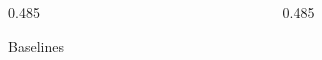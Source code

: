 \documentclass[final]{beamer}
\newcommand{\symA}{\textcolor{ecblue}{\texttt{a}}}
\newcommand{\symB}{\textcolor{ecorange}{\texttt{b}}}
\newcommand{\symC}{\textcolor{ecpurple}{\texttt{c}}}
\newcommand{\ob}[1]{\textcolor{evallmHighlight}{\textbf{#1}}} %
\newcommand{\pulled}[1]{\highLight[ecgreen!28]{\textbf{#1}}}
\newcommand{\qt}[1]{\highLight[evallmHighlight!30]{#1}}
\newcommand{\mask}{\textbf{\textcolor{ecgreen}{?}}}
\begin{document}
\begin{frame}[t]
\begin{columns}[t, totalwidth=\textwidth]
\begin{column}{0.485\textwidth}
\begin{minipage}[t][\colht][t]{\linewidth}
\begin{block}{Baselines}
{    %
      
    \par}
  \end{block}

\end{minipage}
\end{column}

\begin{column}{0.485\textwidth}
\begin{minipage}[t][\colht][t]{\linewidth}



\end{minipage}
\end{column}
\end{columns}
\end{frame}
\end{document}
